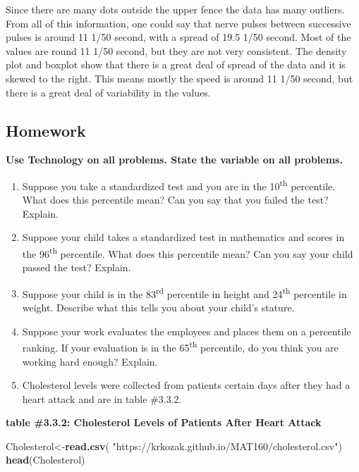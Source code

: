 \documentclass[
]{book}
\newenvironment{Shaded}{\begin{snugshade}}{\end{snugshade}}
\newcommand{\KeywordTok}[1]{\textcolor[rgb]{0.13,0.29,0.53}{\textbf{#1}}}
\newcommand{\NormalTok}[1]{#1}
\newcommand{\StringTok}[1]{\textcolor[rgb]{0.31,0.60,0.02}{#1}}
\begin{document}
Since there are many dots outside the upper fence the data has many outliers. From all of this information, one could say that nerve pulses between successive pulses is around 11 1/50 second, with a spread of 19.5 1/50 second. Most of the values are round 11 1/50 second, but they are not very consistent. The density plot and boxplot show that there is a great deal of spread of the data and it is skewed to the right. This means mostly the speed is around 11 1/50 second, but there is a great deal of variability in the values.

\hypertarget{homework-2}{%
\subsection{Homework}\label{homework-2}}

\textbf{Use Technology on all problems. State the variable on all problems.}

\begin{enumerate}
\def\labelenumi{\arabic{enumi}.}
\item
  Suppose you take a standardized test and you are in the 10\textsuperscript{th} percentile. What does this percentile mean? Can you say that you failed the test? Explain.
\item
  Suppose your child takes a standardized test in mathematics and scores in the 96\textsuperscript{th} percentile. What does this percentile mean? Can you say your child passed the test? Explain.
\item
  Suppose your child is in the 83\textsuperscript{rd} percentile in height and 24\textsuperscript{th} percentile in weight. Describe what this tells you about your child's stature.
\item
  Suppose your work evaluates the employees and places them on a percentile ranking. If your evaluation is in the 65\textsuperscript{th} percentile, do you think you are working hard enough? Explain.
\item
  Cholesterol levels were collected from patients certain days after they had a heart attack and are in table \#3.3.2.
\end{enumerate}

\textbf{table \#3.3.2: Cholesterol Levels of Patients After Heart Attack}

\begin{Shaded}
\begin{Highlighting}[]
\NormalTok{Cholesterol<-}\KeywordTok{read.csv}\NormalTok{(}
  \StringTok{"https://krkozak.github.io/MAT160/cholesterol.csv"}\NormalTok{)}
\KeywordTok{head}\NormalTok{(Cholesterol)}
\end{Highlighting}
\end{Shaded}
\end{document}
